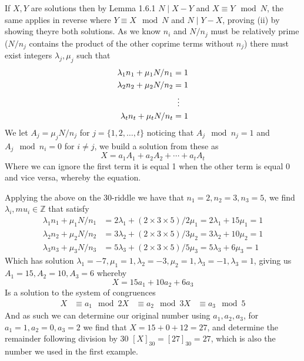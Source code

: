 \begin{prf}
    If $X,Y$ are solutions then by Lemma 1.6.1 $N\mid X-Y$ and $X\equiv Y\mod N$, the same applies in reverse where $Y\equiv X\mod N$ and $N\mid Y-X$, proving (ii) by showing theyre both solutions. As we know $n_{i}$ and $N/n_{j}$ must be relatively prime ($N/n_{j}$ contains the product of the other coprime terms without $n_{j}$) there must exist integers $\lambda_{j},\mu_{j}$ such that
    \begin{align*}
        \lambda_{1} n_{1}+\mu_{1}N/n_{1}&=1 \\
        \lambda_{2}n_{2}+\mu_{2}N/n_{2}&=1 \\
                                       &\vdotswithin{\equiv} \\
        \lambda_{t}n_{t}+\mu_{t}N/n_{t}&=1
    \end{align*}
    We let $A_{j}=\mu_{j}N/n_{j}$ for $j=\{1,2,\ldots,t\}$ noticing that $A_{j}\mod n_{j}=1$ and $A_{j}\mod n_{i}=0$ for $i\neq j$, we build a solution from these as
    \[
        X=a_{1}A_{1}+a_{2}A_{2}+\cdots+a_{t}A_{t}
    \]
    Where we can ignore the first term it is equal 1 when the other term is equal 0 and vice versa, whereby the equation.
\end{prf}
\begin{exmp}
    Applying the above on the 30-riddle we have that $n_{1}=2,n_{2}=3,n_{3}=5$, we find $\lambda_{i},mu_{i}\in\mathbb{Z}$ that satisfy
    \begin{align*}
        \lambda_{1}n_{1}+\mu_{1}N/n_{1}&=2\lambda_{1}+(2\times 3\times 5)/2\mu_{1}=2\lambda_{1}+15\mu_{1}=1 \\
        \lambda_{2}n_{2}+\mu_{2}N/n_{2}&=3\lambda_{2}+(2\times 3\times 5)/3\mu_{2}=3\lambda_{2}+10\mu_{2}=1 \\
        \lambda_{3}n_{3}+\mu_{3}N/n_{3}&=5\lambda_{3}+(2\times 3\times 5)/5\mu_{3}=5\lambda_{3}+6\mu_{3}=1
    \end{align*}
    Which has solution $\lambda_{1}=-7,\mu_{1}=1,\lambda_{2}=-3,\mu_{2}=1,\lambda_{3}=-1,\lambda_{3}=1$, giving us $A_{1}=15,A_{2}=10,A_{3}=6$ whereby
    \[
        X=15a_{1}+10a_{2}+6a_{3}
    \]
    Is a solution to the system of congruences
    \begin{align*}
        X&\equiv a_{1}\mod 2
        X&\equiv a_{2}\mod 3
        X&\equiv a_{3}\mod 5
    \end{align*}
    And as such we can determine our original number using $a_{1},a_{2},a_{3}$, for $a_{1}=1,a_{2}=0,a_{3}=2$ we find that $X=15+0+12=27$, and determine the remainder following division by 30 $[X]_{30}=[27]_{30}=27$, which is also the number we used in the first example.
\end{exmp}

